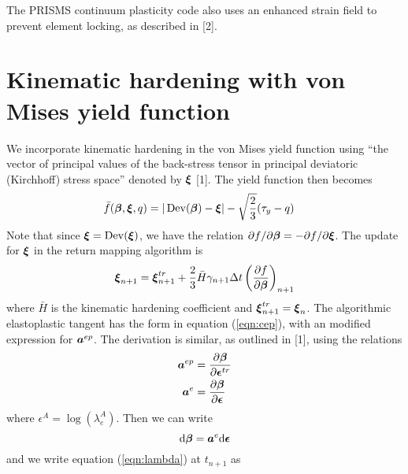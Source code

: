 \documentclass[10pt]{article}
\begin{document}
The PRISMS continuum plasticity code also uses an enhanced strain field to prevent element locking, as described in [2].

\section{Kinematic hardening with von Mises yield function}
We incorporate kinematic hardening in the von Mises yield function using ``the vector of principal values of the back-stress tensor in principal deviatoric (Kirchhoff) stress space'' denoted by $\mbox{\boldmath$\xi$}$ [1]. The yield function then becomes
\begin{align}
\bar{f}(\mbox{\boldmath$\beta$},\mbox{\boldmath$\xi$},q) &= |\mathop{\rm Dev}\nolimits(\mbox{\boldmath$\beta$})-\mbox{\boldmath$\xi$}| - \sqrt{\frac{2}{3}}(\tau_y - q)
\end{align}
Note that since $\mbox{\boldmath$\xi$} = \mathop{\rm Dev}\nolimits(\mbox{\boldmath$\xi$})$, we have the relation $\partial f/\partial\mbox{\boldmath$\beta$} = -\partial f/\partial\mbox{\boldmath$\xi$}$. The update for $\mbox{\boldmath$\xi$}$ in the return mapping algorithm is
\begin{align}
\mbox{\boldmath$\xi$}_{n+1} = \mbox{\boldmath$\xi$}^{tr}_{n+1} + \frac{2}{3}\bar{H}\gamma_{n+1}\Delta t\left(\frac{\partial f}{\partial\mbox{\boldmath$\beta$}}\right)_{n+1}
\label{eqn:xi}
\end{align}
where $\bar{H}$ is the kinematic hardening coefficient and $\mbox{\boldmath$\xi$}^{tr}_{n+1} = \mbox{\boldmath$\xi$}_{n}$. The algorithmic elastoplastic tangent has the form in equation (\ref{eqn:cep}), with an modified expression for $\mbox{\boldmath$ a$}^{ep}$. The derivation is similar, as outlined in [1], using the relations
\begin{equation}
\begin{aligned}
\mbox{\boldmath$ a$}^{ep} &= \frac{\partial \mbox{\boldmath$\beta$}}{\partial \mbox{\boldmath$\epsilon$}^{tr}}\\
\mbox{\boldmath$ a$}^{e} &= \frac{\partial \mbox{\boldmath$\beta$}}{\partial \mbox{\boldmath$\epsilon$}}
\end{aligned}
\end{equation}
where $\epsilon^A = \log(\lambda^A_e)$. 
Then we can write
\begin{equation}
\mathrm{d}\mbox{\boldmath$\beta$} = \mbox{\boldmath$ a$}^e\mathrm{d}\mbox{\boldmath$\epsilon$}
\label{eqn:dbeta}
\end{equation}
and we write equation (\ref{eqn:lambda}) at $t_{n+1}$ as 
\end{document}
